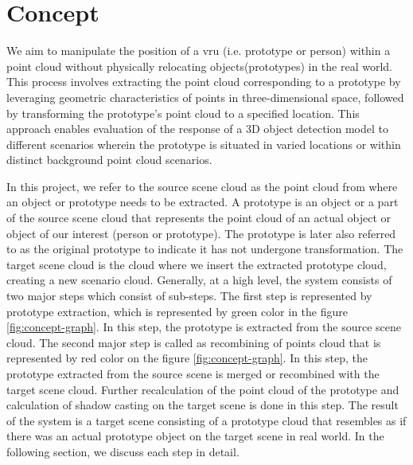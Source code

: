 \chapter{Concept}

We aim to manipulate the position of a \acrshort{vru} (i.e. prototype or person) within a point cloud without physically relocating objects(prototypes) in the real world. This process involves extracting the point cloud corresponding to a prototype by leveraging geometric characteristics of points in three-dimensional space, followed by transforming the prototype's point cloud to a specified location. This approach enables evaluation of the response of a 3D object detection model to different scenarios wherein the prototype is situated in varied locations or within distinct background point cloud scenarios.

In this project, we refer to the source scene cloud as the point cloud from where an object or prototype needs to be extracted. A prototype is an object or a part of the source scene cloud that represents the point cloud of an actual object or object of our interest (person or prototype). The prototype is later also referred to as the original prototype to indicate it has not undergone transformation. The target scene cloud is the cloud where we insert the extracted prototype cloud, creating a new scenario cloud. Generally, at a high level, the system consists of two major steps which consist of sub-steps. The first step is represented by prototype extraction, which is represented by green color in the figure \ref{fig:concept-graph}. In this step, the prototype is extracted from the source scene cloud. The second major step is called as recombining of points cloud that is represented by red color on the figure \ref{fig:concept-graph}. In this step, the prototype extracted from the source scene is merged or recombined with the target scene cloud. Further recalculation of the point cloud of the prototype and calculation of shadow casting on the target scene is done in this step. The result of the system is a target scene consisting of a prototype cloud that resembles as if there was an actual prototype object on the target scene in real world. In the following section, we discuss each step in detail.

